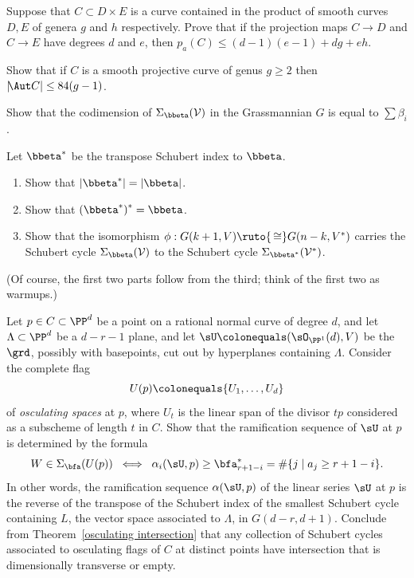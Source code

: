 \begin{exercise}\label{curve in a product}
Suppose that $C\subset D\times E$ is a curve contained in the product
of smooth curves $D,E$ of genera $g$ and $h$ respectively.
Prove that if the projection maps $C \to D$ and $C\to E$
have degrees
$d$ and $e$,
then
$p_a(C)\leq (d-1)(e-1) +dg+eh$.
\end{exercise}

\begin{exercise}\label{84(g-1)}
Show that if $C$ is a smooth projective curve of genus $g \geq 2$ then
$|\!\Aut C| \leq 84(g-1)$.
\end{exercise}

\begin{exercise}\label{codim Schubert}
Show that the codimension of $\Sigma_{\bbeta}({\cal V})$ in the
%
Grassmannian $G$ is equal to $\sum \beta_i$.
\end{exercise}

\begin{exercise}\label{Schubert duality}
Let ${\bbeta}^*$ be
the transpose Schubert index to $\bbeta$.
\begin{enumerate}
\item  Show that $|\bbeta^*| = |\bbeta|$.
\item Show that $(\bbeta^*){\vphantom{\bbeta}}^* = \bbeta$. %
\item Show that the isomorphism $\phi : G(k+1, V) \ruto{\,\cong}
G(n-k, V^*)$ carries the Schubert cycle $\Sigma_\bbeta({\cal V})$ to the
Schubert cycle $\Sigma_{\bbeta^*}({\cal V}^*)$.
\end{enumerate}
(Of course, the first two parts follow from the third; think of the
first two as warmups.)
\end{exercise}

\begin{exercise}\label{osculating
planes}
Let $p\in C\subset \PP^{d}$ be a point on a rational normal curve of
degree $d$, and
let $\Lambda\subset \PP^{d}$ be a $d-r-1$ plane, and let  $\sU
\colonequals (\sO_{\PP^{1}}(d), V)$
be
the  $\grd$,  possibly with basepoints, cut out by hyperplanes containing
$\Lambda$.
Consider the complete flag
$$
U(p) \colonequals  \{U_{1}, \dots, U_{d}\}
$$
of \emph{osculating spaces} at $p$, where $U_{t}$ is the linear span of
%
the divisor $tp$ considered
as a subscheme of length $t$ in $C$. Show that the ramification sequence
%
of $\sU$ at $p$
is determined by the formula
$$
W \in \Sigma_{\bfa}(U(p))
\; \iff \; \alpha_i(\sU, p) \geq \bfa^*_{r+1-i} = \#\{j\mid a_j\geq
r+1-i\}.
$$
In other words, the ramification sequence $\alpha(\sU, p)$ of the linear
series $\sU$ at $p$ is the reverse of the transpose of the Schubert
index of the smallest Schubert cycle containing $L$, the vector
space associated to $\Lambda$, in  $G(d-r, d+1)$. Conclude from
Theorem~\ref{osculating intersection}
that any collection of Schubert cycles associated to osculating flags
of $C$ at distinct points have intersection
that is dimensionally transverse or empty.
\end{exercise}

